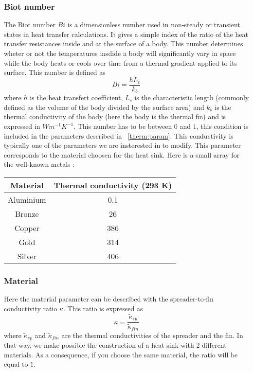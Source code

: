 \subsubsection{Biot number}
The Biot number $Bi$ is a dimensionless number used in non-steady or transient states in heat transfer calculations. It gives a simple index of the ratio of the heat transfer resistances inside  and at the surface of a body. This number determines wheter or not the temperatures insdide a body will significantly vary in space while the body heats or cools over time from a thermal gradient applied to its surface. This number is defined as 
\begin{equation}
Bi = \frac{hL_c}{k_b}
\end{equation} 
where $h$ is the heat transfert coefficient, $L_c$ is the characteristic length (commonly defined as the volume of the body divided by the surface area) and $k_b$ is the thermal conductivity of the body (here the body is the thermal fin) and is expressed in $Wm^{-1}K^{-1}$. This number has to be between $0$ and $1$, this condition is included in the parameters described in ~\ref{therm:param}. This conductivity is typically one of the parameters we are insterested in to modify. This parameter corresponds to the material choosen for the heat sink. Here is a small array for the well-known metals :
\begin{center}
\begin{tabular}{|c|c|}
  \hline
  Material & Thermal conductivity (293 K)\\
  \hline
  \hline
  Aluminium & 0.1 \\
  \hline
  Bronze & 26 \\
  \hline
  Copper & 386 \\
  \hline
  Gold & 314 \\
  \hline
  Silver & 406 \\
  \hline
\end{tabular}
\end{center}

\subsubsection{Material}

Here the material parameter can be described with the spreader-to-fin conductivity ratio $\kappa$. This ratio is expressed as
\begin{equation*}
\displaystyle{\kappa = \frac{\tilde{\kappa}_{sp}}{\tilde{\kappa}_{fin}}}
\end{equation*}
where $\tilde{\kappa}_{sp}$ and $\tilde{\kappa}_{fin}$ are the thermal conductivities of the spreader and the fin. In that way, we make possible the construction of a heat sink with $2$ different materials. As a consequence, if you choose the same material, the ratio will be equal to $1$.

